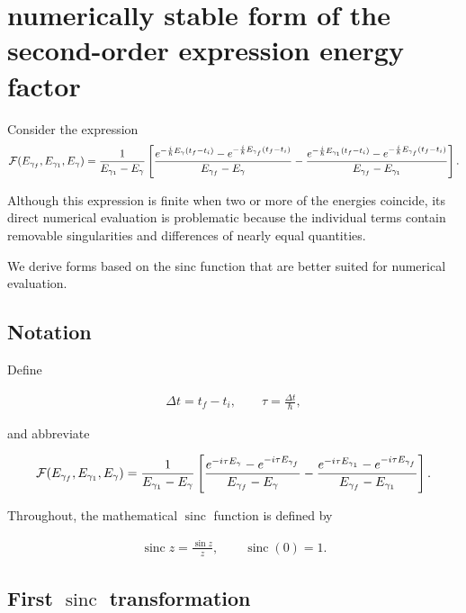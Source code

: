 \section{ numerically stable form of the second-order expression energy factor}

Consider the expression
\begin{align}
  {\cal F}(E_{\gamma_f}, E_{\gamma_1}, E_\gamma)= \frac{1}{E_{\gamma_1}-E_\gamma} \left[
    \frac{e^{-\frac{i}{\hbar}E_\gamma(t_f-t_i)}
    -e^{-\frac{i}{\hbar}E_{\gamma_f}(t_f-t_i)}}
    {E_{\gamma_f}-E_\gamma}
    -
    \frac{e^{-\frac{i}{\hbar}E_{\gamma_1}(t_f-t_i)}
    -e^{-\frac{i}{\hbar}E_{\gamma_f}(t_f-t_i)}}
    {E_{\gamma_f}-E_{\gamma_1}}
  \right].
\end{align}

Although this expression is finite when two or more of the energies
coincide, its direct numerical evaluation is problematic because the
individual terms contain removable singularities and differences of
nearly equal quantities.

We derive forms based on the sinc function that are better suited for
numerical evaluation.

\subsection{ Notation}

Define

\begin{align}\Delta t=t_f-t_i, \qquad
  \tau=\frac{\Delta t}{\hbar},
\end{align}

and abbreviate

\begin{align}    {\cal F}(E_{\gamma_f}, E_{\gamma_1}, E_\gamma)= \frac{1}{E_{\gamma_1}-E_\gamma} \left[
    \frac{e^{-i\tau E_\gamma}-e^{-i\tau E_{\gamma_f}}}{E_{\gamma_f}-E_\gamma}
    -
    \frac{e^{-i\tau E_{\gamma_1}}-e^{-i\tau E_{\gamma_f}}}{E_{\gamma_f}-E_{\gamma_1}}
  \right].
\end{align}

Throughout, the mathematical $\operatorname{sinc}$ function is defined by

\begin{align}\operatorname{sinc}z=\frac{\sin z}{z}, \qquad
  \operatorname{sinc}(0)=1.
\end{align}

\subsection{ First $\operatorname{sinc}$ transformation}\label{second-regularization}

